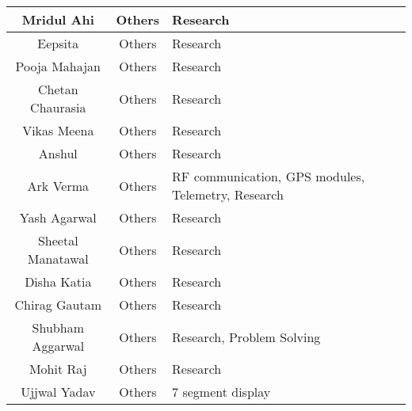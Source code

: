 \begin{center}
\begin{longtable}{ | c | c | m{6cm} | }
        Mridul Ahi                 & Others            & Research                                                                \\
        \hline
        Eepsita                    & Others            & Research                                                                \\
        \hline
        Pooja Mahajan              & Others            & Research                                                                \\
        \hline
        Chetan Chaurasia           & Others            & Research                                                                \\
        \hline
        Vikas Meena                & Others            & Research                                                                \\
        \hline
        Anshul                     & Others            & Research                                                                \\
        \hline
        Ark Verma                  & Others            & RF communication, \ac{GPS} modules, Telemetry, Research                 \\
        \hline
        Yash Agarwal               & Others            & Research                                                                \\
        \hline
        Sheetal Manatawal          & Others            & Research                                                                \\
        \hline
        Disha Katia                & Others            & Research                                                                \\
        \hline
        Chirag Gautam              & Others            & Research                                                                \\
        \hline
        Shubham Aggarwal           & Others            & Research, Problem Solving                                               \\
        \hline
        Mohit Raj                  & Others            & Research                                                                \\
        \hline
        Ujjwal Yadav               & Others            & 7 segment display                                                       \\

\end{longtable}
\end{center}

